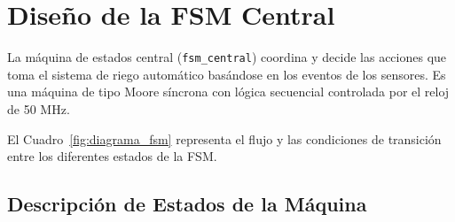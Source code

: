 \section{Diseño de la FSM Central}

La máquina de estados central (\texttt{fsm\_central}) coordina y decide las acciones que toma el sistema de riego automático basándose en los eventos de los sensores. Es una máquina de tipo Moore síncrona con lógica secuencial controlada por el reloj de 50 MHz.

El Cuadro~\ref{fig:diagrama_fsm} representa el flujo y las condiciones de transición entre los diferentes estados de la FSM.

\label{fig:diagrama_fsm}

\subsection{Descripción de Estados de la Máquina}


